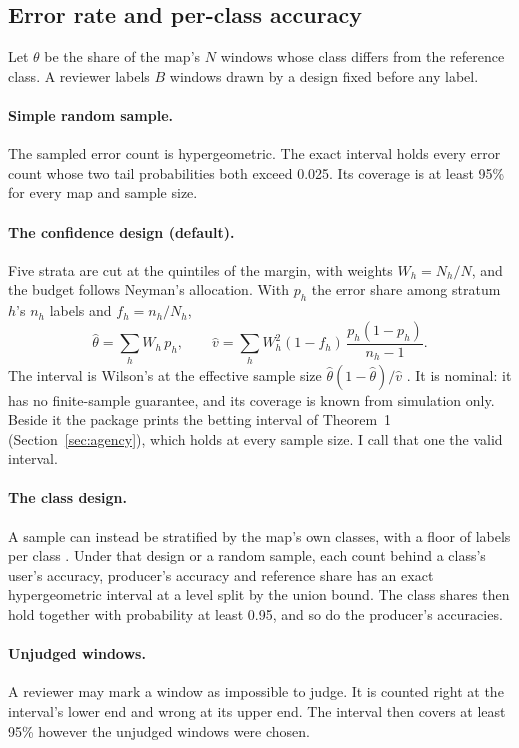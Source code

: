 \documentclass[11pt,a4paper]{article}
\begin{document}
\subsection{Error rate and per-class accuracy}
\label{sec:estimate}

Let $\theta$ be the share of the map's $N$ windows whose class differs from the reference class. A reviewer labels
$B$ windows drawn by a design fixed before any label.

\paragraph{Simple random sample.} The sampled error count is hypergeometric. The exact interval holds every error
count whose two tail probabilities both exceed 0.025. Its coverage is at least 95\% for every map and sample size.

\paragraph{The confidence design (default).} Five strata are cut at the quintiles of the margin, with weights
$W_h = N_h/N$, and the budget follows Neyman's allocation. With $p_h$ the error share among stratum $h$'s $n_h$
labels and $f_h = n_h/N_h$,
\begin{equation}
  \hat\theta = \sum_h W_h \, p_h, \qquad
  \hat v = \sum_h W_h^2 (1 - f_h) \, \frac{p_h (1 - p_h)}{n_h - 1}.
\end{equation}
The interval is Wilson's at the effective sample size $\hat\theta(1-\hat\theta)/\hat v$ \citep{korn1998}. It is
nominal: it has no finite-sample guarantee, and its coverage is known from simulation only. Beside it the package
prints the betting interval of Theorem~1 (Section~\ref{sec:agency}), which holds at every sample size. I call that
one the valid interval.

\paragraph{The class design.} A sample can instead be stratified by the map's own classes, with a floor of labels
per class \citep{olofsson2014}. Under that design or a random sample, each count behind a class's user's accuracy,
producer's accuracy and reference share has an exact hypergeometric interval at a level split by the union bound.
The class shares then hold together with probability at least 0.95, and so do the producer's accuracies.

\paragraph{Unjudged windows.} A reviewer may mark a window as impossible to judge. It is counted right at the
interval's lower end and wrong at its upper end. The interval then covers at least 95\% however the unjudged windows
were chosen.
\end{document}
